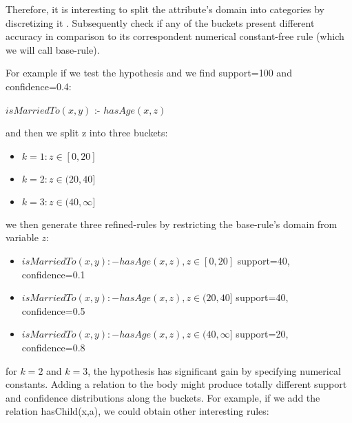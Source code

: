 Therefore, it is interesting to split the attribute's domain into categories by discretizing it .
Subsequently check if any of the buckets present different accuracy in comparison to its correspondent numerical
constant-free rule (which we will call base-rule).

For example if we test the hypothesis and we find support=100 and confidence=0.4:

\begin{center}
 $isMarriedTo(x,y)$ :- $hasAge(x,z)$ 
\end{center}

and then we split z into three buckets:

\begin{itemize}
 \item \begin{math} k=1: z\in[0,20]\end{math}
 \item \begin{math} k=2: z\in(20,40]\end{math}
 \item \begin{math} k=3: z\in(40,\infty]\end{math}
\end{itemize}

we then generate three refined-rules by restricting the base-rule's domain from variable $z$:

\begin{itemize}

 \item \begin{math}isMarriedTo(x,y) :- hasAge(x,z), z\in[0,20]\end{math}	
    \newline support=40, confidence=0.1
 \item \begin{math}isMarriedTo(x,y) :- hasAge(x,z), z\in(20,40]\end{math}	
    \newline support=40, confidence=0.5
 \item \begin{math}isMarriedTo(x,y) :- hasAge(x,z), z\in(40,\infty]\end{math}
    \newline support=20, confidence=0.8

\end{itemize}

for $k=2$ and $k=3$, the hypothesis has significant gain by specifying numerical constants. Adding a relation to the
body might produce totally different support and confidence distributions along the buckets. For example, if we add the
relation hasChild(x,a), we could obtain other interesting rules:

